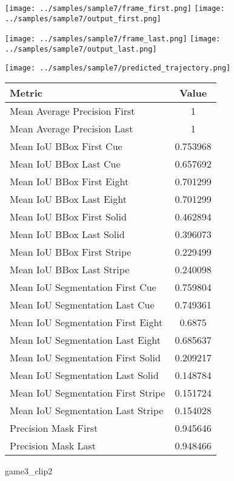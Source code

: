 \begin{figure}
\texttt{[image: ../samples/sample7/frame\_first.png]}
\texttt{[image: ../samples/sample7/output\_first.png]}\par
\texttt{[image: ../samples/sample7/frame\_last.png]}
\texttt{[image: ../samples/sample7/output\_last.png]}\par
\centering
\texttt{[image: ../samples/sample7/predicted\_trajectory.png]}
\caption{game3\_clip2}
\vspace{10pt}
\begin{tabular}{|l|c|}
\hline
\textbf{Metric} & \textbf{Value} \\
\hline
Mean Average Precision First & 1 \\
Mean Average Precision Last & 1 \\
\hline
Mean IoU BBox First Cue & 0.753968 \\
Mean IoU BBox Last Cue & 0.657692 \\
Mean IoU BBox First Eight & 0.701299 \\
Mean IoU BBox Last Eight & 0.701299 \\
Mean IoU BBox First Solid & 0.462894 \\
Mean IoU BBox Last Solid & 0.396073 \\
Mean IoU BBox First Stripe & 0.229499 \\
Mean IoU BBox Last Stripe & 0.240098 \\
\hline
Mean IoU Segmentation First Cue & 0.759804 \\
Mean IoU Segmentation Last Cue & 0.749361 \\
Mean IoU Segmentation First Eight & 0.6875 \\
Mean IoU Segmentation Last Eight & 0.685637 \\
Mean IoU Segmentation First Solid & 0.209217 \\
Mean IoU Segmentation Last Solid & 0.148784 \\
Mean IoU Segmentation First Stripe & 0.151724 \\
Mean IoU Segmentation Last Stripe & 0.154028 \\
\hline
Precision Mask First & 0.945646 \\
Precision Mask Last & 0.948466 \\
\hline
\end{tabular}
\end{figure}

